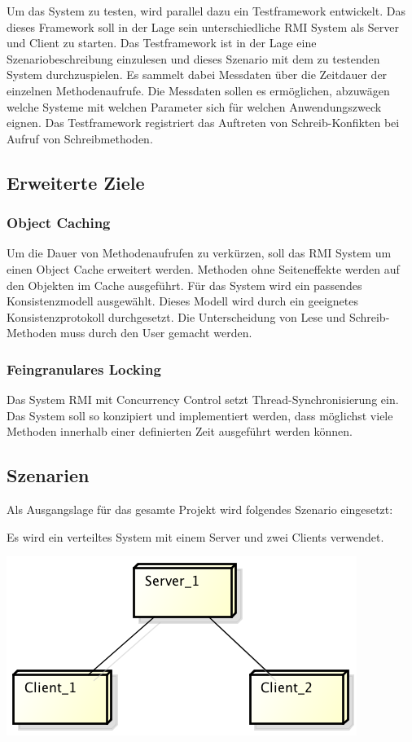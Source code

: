 \documentclass{article}
\begin{document}
Um das System zu testen, wird parallel dazu ein Testframework entwickelt. Das dieses Framework soll in der Lage sein unterschiedliche RMI System als Server und Client zu starten. Das Testframework ist in der Lage eine Szenariobeschreibung einzulesen und dieses Szenario mit dem zu testenden System durchzuspielen. Es sammelt dabei Messdaten über die Zeitdauer der einzelnen Methodenaufrufe. Die Messdaten sollen es ermöglichen, abzuwägen welche Systeme mit welchen Parameter sich für welchen Anwendungszweck eignen.
Das Testframework registriert das Auftreten von Schreib-Konfikten bei Aufruf von Schreibmethoden.

\subsection{Erweiterte Ziele}
\label{sec:erweiterte-ziele}

\subsubsection{Object Caching}
\label{sec:object-caching}

Um die Dauer von Methodenaufrufen zu verkürzen, soll das RMI System um einen Object Cache erweitert werden. Methoden ohne Seiteneffekte werden auf den Objekten im Cache ausgeführt. Für das System wird ein passendes Konsistenzmodell ausgewählt. Dieses Modell wird durch ein geeignetes Konsistenzprotokoll durchgesetzt. Die Unterscheidung von Lese und Schreib- Methoden muss durch den User gemacht werden.

\subsubsection{Feingranulares Locking}
\label{sec:feingr-lock}

Das System RMI mit Concurrency Control setzt Thread-Synchronisierung ein. Das System soll so konzipiert und implementiert werden, dass möglichst viele Methoden innerhalb einer definierten Zeit ausgeführt werden können.

\subsection{Szenarien}
\label{sec:szenario}

Als Ausgangslage für das gesamte Projekt wird folgendes Szenario eingesetzt:

Es wird ein verteiltes System mit einem Server und zwei Clients verwendet.
\begin{center}
\includegraphics[scale=0.85]{Deployment.png}
\end{center}
\end{document}
